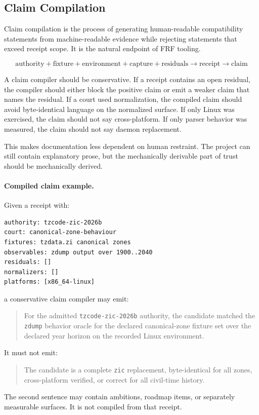 \documentclass[11pt,a4paper]{article}
\newcommand{\frf}{\textsc{FRF}}
\begin{document}
\subsection{Claim Compilation}

Claim compilation is the process of generating human-readable compatibility statements from machine-readable evidence while rejecting statements that exceed receipt scope. It is the natural endpoint of \frf{} tooling.

\[
\text{authority} + \text{fixture} + \text{environment} + \text{capture} + \text{residuals}
\rightarrow
\text{receipt}
\rightarrow
\text{claim}
\]

A claim compiler should be conservative. If a receipt contains an open residual, the compiler should either block the positive claim or emit a weaker claim that names the residual. If a court used normalization, the compiled claim should avoid byte-identical language on the normalized surface. If only Linux was exercised, the claim should not say cross-platform. If only parser behavior was measured, the claim should not say daemon replacement.

This makes documentation less dependent on human restraint. The project can still contain explanatory prose, but the mechanically derivable part of trust should be mechanically derived.

\paragraph{Compiled claim example.}
Given a receipt with:
\begin{verbatim}
authority: tzcode-zic-2026b
court: canonical-zone-behaviour
fixtures: tzdata.zi canonical zones
observables: zdump output over 1900..2040
residuals: []
normalizers: []
platforms: [x86_64-linux]
\end{verbatim}
a conservative claim compiler may emit:
\begin{quote}
For the admitted \texttt{tzcode-zic-2026b} authority, the candidate matched the \texttt{zdump} behavior oracle for the declared canonical-zone fixture set over the declared year horizon on the recorded Linux environment.
\end{quote}
It must not emit:
\begin{quote}
The candidate is a complete \texttt{zic} replacement, byte-identical for all zones, cross-platform verified, or correct for all civil-time history.
\end{quote}
The second sentence may contain ambitions, roadmap items, or separately measurable surfaces. It is not compiled from that receipt.
\end{document}
